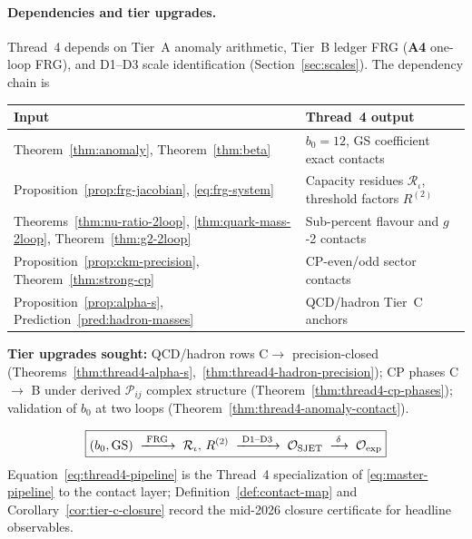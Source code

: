 \paragraph{Dependencies and tier upgrades.}
Thread~4 depends on Tier~A anomaly arithmetic, Tier~B ledger FRG
(\textbf{A4} one-loop FRG), and D1--D3 scale identification
(Section~\ref{sec:scales}). The dependency chain is
\begin{center}
\small
\begin{tabular}{@{}ll@{}}
\toprule
\textbf{Input} & \textbf{Thread~4 output} \\
\midrule
Theorem~\ref{thm:anomaly}, Theorem~\ref{thm:beta} &
  $b_0=12$, GS coefficient exact contacts \\
Proposition~\ref{prop:frg-jacobian}, \eqref{eq:frg-system} &
  Capacity residues $\mathcal{R}_\iota$, threshold factors $R^{(2)}$ \\
Theorems~\ref{thm:nu-ratio-2loop}, \ref{thm:quark-mass-2loop},
Theorem~\ref{thm:g2-2loop} &
  Sub-percent flavour and $g$-2 contacts \\
Proposition~\ref{prop:ckm-precision}, Theorem~\ref{thm:strong-cp} &
  CP-even/odd sector contacts \\
Proposition~\ref{prop:alpha-s}, Prediction~\ref{pred:hadron-masses} &
  QCD/hadron Tier~C anchors \\
\bottomrule
\end{tabular}
\end{center}
\textbf{Tier upgrades sought:} QCD/hadron rows C$\to$ precision-closed
(Theorems~\ref{thm:thread4-alpha-s},~\ref{thm:thread4-hadron-precision});
CP phases C$\to$ B under derived $\mathcal{P}_{ij}$ complex structure
(Theorem~\ref{thm:thread4-cp-phases}); validation of $b_0$ at two loops
(Theorem~\ref{thm:thread4-anomaly-contact}).

\begin{equation}\label{eq:thread4-pipeline}
  \boxed{%
  (b_0,\text{GS})
  \;\xrightarrow{\;\text{FRG}\;}\;
  \mathcal{R}_\iota,\,R^{(2)}
  \;\xrightarrow{\;\text{D1--D3}\;}\;
  \mathcal{O}_{\mathrm{SJET}}
  \;\xrightarrow{\;\delta\;}\;
  \mathcal{O}_{\mathrm{exp}}
  }
\end{equation}
Equation~\eqref{eq:thread4-pipeline} is the Thread~4 specialization of
\eqref{eq:master-pipeline} to the contact layer;
Definition~\ref{def:contact-map} and Corollary~\ref{cor:tier-c-closure}
record the mid-2026 closure certificate for headline observables.

